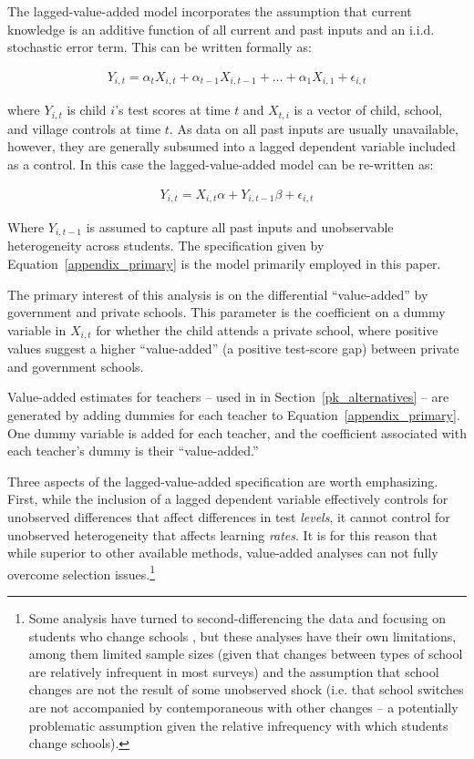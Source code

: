 \documentclass[Eubank_pk_ethnic_sorting.tex]{subfiles}
\begin{document}
The lagged-value-added model incorporates the assumption that current knowledge is an additive function of all current and past inputs and an i.i.d. stochastic error term. This can be written formally as:

\begin{eqnarray}
	Y_{i,t}=\alpha_tX_{i,t}+\alpha_{t-1}X_{i,t-1}+ \dots + \alpha_1X_{i,1} + \epsilon_{i,t}
\end{eqnarray}

where $Y_{i,t}$ is child $i$'s test scores at time $t$ and $X_{t,i}$ is a vector of child, school, and village controls at time $t$. As data on all past inputs are usually unavailable, however, they are generally subsumed into a lagged dependent variable included as a control. In this case the lagged-value-added model can be re-written as:

\begin{eqnarray}
	Y_{i,t}=X_{i,t}\alpha+Y_{i,t-1}\beta + \epsilon_{i,t}\label{appendix_primary}
\end{eqnarray}

Where $Y_{i,t-1}$ is assumed to capture all past inputs and unobservable heterogeneity across students. The specification given by Equation~\ref{appendix_primary} is the model primarily employed in this paper. 

The primary interest of this analysis is on the differential ``value-added'' by government and private schools. This parameter is the coefficient on a dummy variable in $X_{i,t}$ for whether the child attends a private school, where positive values suggest a higher ``value-added'' (a positive test-score gap) between private and government schools. 

Value-added estimates for teachers -- used in in Section~\ref{pk_alternatives} -- are generated by adding dummies for each teacher to Equation~\ref{appendix_primary}. One dummy variable is added for each teacher, and the coefficient associated with each teacher's dummy is their ``value-added.''

Three aspects of the lagged-value-added specification are worth emphasizing. First, while the inclusion of a lagged dependent variable effectively controls for unobserved differences that affect differences in test \emph{levels}, it cannot control for unobserved heterogeneity that affects learning \emph{rates}. It is for this reason that while superior to other available methods, value-added analyses can not fully overcome selection issues.\footnote{Some analysis have turned to second-differencing the data and focusing on students who change schools \citep{Andrabi:2011hl}, but these analyses have their own limitations, among them limited sample sizes (given that changes between types of school are relatively infrequent in most surveys) and the assumption that school changes are not the result of some unobserved shock (i.e. that school switches are not accompanied by contemporaneous with other changes -- a potentially problematic assumption given the relative infrequency with which students change schools).}
\end{document}
